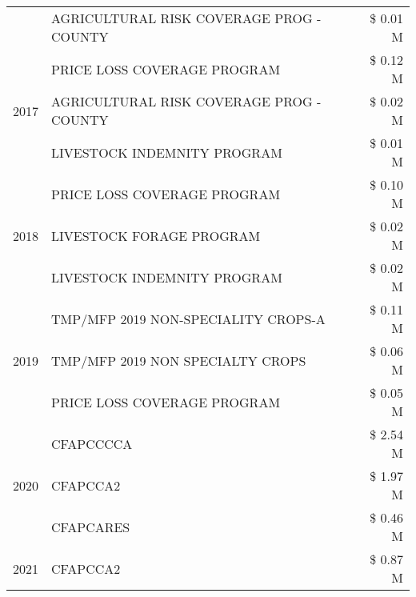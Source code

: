 \begin{tabular}{llr}
 & AGRICULTURAL RISK COVERAGE PROG - COUNTY      & \$ 0.01 M \\
\cline{1-3}
\multirow[t]{3}{*}{2017} & PRICE LOSS COVERAGE PROGRAM & \$ 0.12 M \\
 & AGRICULTURAL RISK COVERAGE PROG - COUNTY & \$ 0.02 M \\
 & LIVESTOCK INDEMNITY PROGRAM & \$ 0.01 M \\
\cline{1-3}
\multirow[t]{3}{*}{2018} & PRICE LOSS COVERAGE PROGRAM & \$ 0.10 M \\
 & LIVESTOCK FORAGE PROGRAM & \$ 0.02 M \\
 & LIVESTOCK INDEMNITY PROGRAM & \$ 0.02 M \\
\cline{1-3}
\multirow[t]{3}{*}{2019} & TMP/MFP 2019 NON-SPECIALITY CROPS-A & \$ 0.11 M \\
 & TMP/MFP 2019 NON SPECIALTY CROPS & \$ 0.06 M \\
 & PRICE LOSS COVERAGE PROGRAM & \$ 0.05 M \\
\cline{1-3}
\multirow[t]{3}{*}{2020} & CFAPCCCCA & \$ 2.54 M \\
 & CFAPCCA2 & \$ 1.97 M \\
 & CFAPCARES & \$ 0.46 M \\
\cline{1-3}
2021 & CFAPCCA2 & \$ 0.87 M \\
\cline{1-3}
\bottomrule
\end{tabular}
